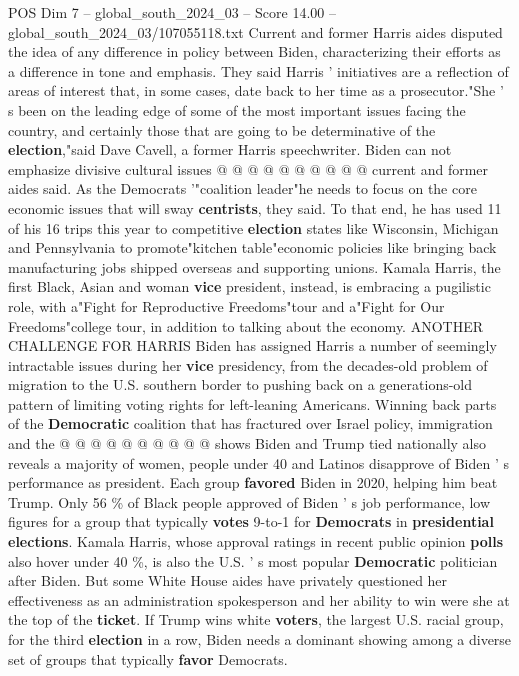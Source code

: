 \begin{textsample}{POS Dim 7 – global\_south\_2024\_03 – Score 14.00 – global\_south\_2024\_03/107055118.txt}
Current and former Harris aides disputed the idea of any difference in policy between Biden, characterizing their efforts as a difference in tone and emphasis.
They said Harris ' initiatives are a reflection of areas of interest that, in some cases, date back to her time as a prosecutor."She ' s been on the leading edge of some of the most important issues facing the country, and certainly those that are going to be determinative of the \textbf{election},"said Dave Cavell, a former Harris speechwriter.
Biden can not emphasize divisive cultural issues @ @ @ @ @ @ @ @ @ @ current and former aides said.
As the Democrats '"coalition leader"he needs to focus on the core economic issues that will sway \textbf{centrists}, they said.
To that end, he has used 11 of his 16 trips this year to competitive \textbf{election} states like Wisconsin, Michigan and Pennsylvania to promote"kitchen table"economic policies like bringing back manufacturing jobs shipped overseas and supporting unions.
Kamala Harris, the first Black, Asian and woman \textbf{vice} president, instead, is embracing a pugilistic role, with a"Fight for Reproductive Freedoms"tour and a"Fight for Our Freedoms"college tour, in addition to talking about the economy.
ANOTHER CHALLENGE FOR HARRIS Biden has assigned Harris a number of seemingly intractable issues during her \textbf{vice} presidency, from the decades-old problem of migration to the U.S. southern border to pushing back on a generations-old pattern of limiting voting rights for left-leaning Americans.
Winning back parts of the \textbf{Democratic} coalition that has fractured over Israel policy, immigration and the @ @ @ @ @ @ @ @ @ @ shows Biden and Trump tied nationally also reveals a majority of women, people under 40 and Latinos disapprove of Biden ' s performance as president.
Each group \textbf{favored} Biden in 2020, helping him beat Trump.
Only 56 \% of Black people approved of Biden ' s job performance, low figures for a group that typically \textbf{votes} 9-to-1 for \textbf{Democrats} in \textbf{presidential} \textbf{elections}.
Kamala Harris, whose approval ratings in recent public opinion \textbf{polls} also hover under 40 \%, is also the U.S. ' s most popular \textbf{Democratic} politician after Biden.
But some White House aides have privately questioned her effectiveness as an administration spokesperson and her ability to win were she at the top of the \textbf{ticket}.
If Trump wins white \textbf{voters}, the largest U.S. racial group, for the third \textbf{election} in a row, Biden needs a dominant showing among a diverse set of groups that typically \textbf{favor} Democrats.

\end{textsample}

